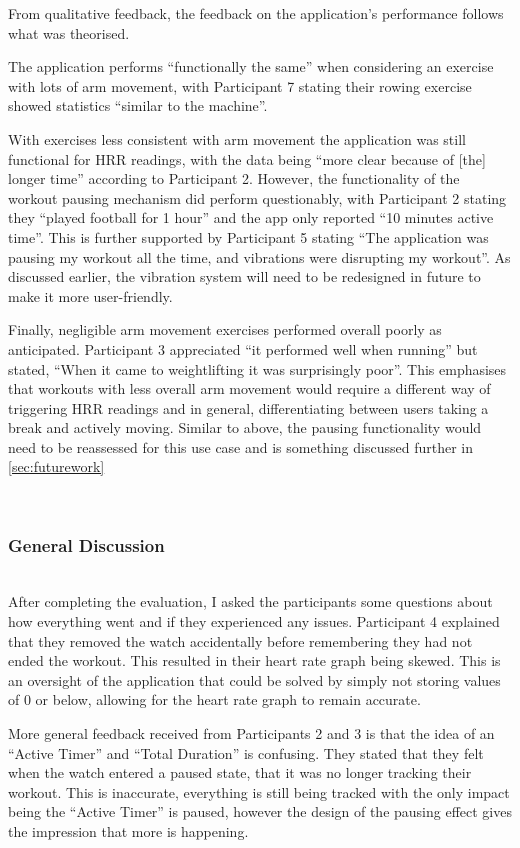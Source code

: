 \documentclass{l4proj}
\begin{document}
From qualitative feedback, the feedback on the application’s performance follows what was theorised. 

The application performs “functionally the same” when considering an exercise with lots of arm movement, with Participant 7 stating their rowing exercise showed statistics “similar to the machine”. 

With exercises less consistent with arm movement the application was still functional for HRR readings, with the data being “more clear because of [the] longer time” according to Participant 2. However, the functionality of the workout pausing mechanism did perform questionably, with Participant 2 stating they “played football for 1 hour” and the app only reported “10 minutes active time”. This is further supported by Participant 5 stating “The application was pausing my workout all the time, and vibrations were disrupting my workout”. As discussed earlier, the vibration system will need to be redesigned in future to make it more user-friendly.

Finally, negligible arm movement exercises performed overall poorly as anticipated. Participant 3 appreciated “it performed well when running” but stated, “When it came to weightlifting it was surprisingly poor”. This emphasises that workouts with less overall arm movement would require a different way of triggering HRR readings and in general, differentiating between users taking a break and actively moving. Similar to above, the pausing functionality would need to be reassessed for this use case and is something discussed further in \ref{sec:futurework}

\noindent\mbox{}\\
\subsubsection{General Discussion}
\noindent\mbox{}\\

After completing the evaluation, I asked the participants some questions about how everything went and if they experienced any issues. Participant 4 explained that they removed the watch accidentally before remembering they had not ended the workout. This resulted in their heart rate graph being skewed. This is an oversight of the application that could be solved by simply not storing values of 0 or below, allowing for the heart rate graph to remain accurate.

More general feedback received from Participants 2 and 3 is that the idea of an “Active Timer” and “Total Duration” is confusing. They stated that they felt when the watch entered a paused state, that it was no longer tracking their workout. This is inaccurate, everything is still being tracked with the only impact being the “Active Timer” is paused, however the design of the pausing effect gives the impression that more is happening.
\end{document}
